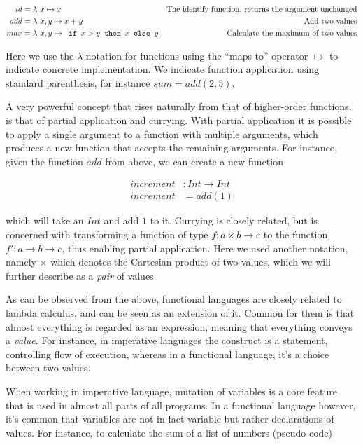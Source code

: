 \begin{align*}
id &= \lambda{} \ x \mapsto{} x & \text{The identify function, returns the argument unchanged}\\
add &= \lambda{} \  x, y  \mapsto{}  x + y   & \text{Add two values}\\
max &= \lambda{} \  x, y  \mapsto{}  \texttt{ if } x > y \texttt{ then } x \texttt{ else } y   & \text{Calculate the maximum of two values}\\
\end{align*}

Here we use the $\lambda$ notation for functions using the ``maps to'' operator $\mapsto$ to indicate concrete implementation. We indicate function application using standard parenthesis, for instance $sum = add(2, 5)$.

A very powerful concept that rises naturally from that of higher-order functions, is that of partial application and currying. With partial application it is possible to apply a single argument to a function with multiple arguments, which produces a new function that accepts the remaining arguments. For instance, given the function $add$ from above, we can create a new function 

\begin{align*}
increment &: Int \to Int\\
increment &= add(1)
\end{align*}

which will take an $Int$ and add $1$ to it. Currying is closely related, but is concerned with transforming a function of type $f : a \times b \to c$ to the function $f' : a \to b \to c$, thus enabling partial application. Here we used another notation, namely $\times$ which denotes the Cartesian product of two values, which we will further describe as a \emph{pair} of values.

As can be observed from the above, functional languages are closely related to lambda calculus, and can be seen as an extension of it. Common for them is that almost everything is regarded as an expression, meaning that everything conveys a \emph{value}. For instance, in imperative languages the  construct is a statement, controlling flow of execution, whereas in a functional language, it's a choice between two values.

When working in imperative language, mutation of variables is a core feature that is used in almost all parts of all programs. In a functional language however, it's common that variables are not in fact variable but rather declarations of values. For instance, to calculate the sum of a list of numbers (pseudo-code)

